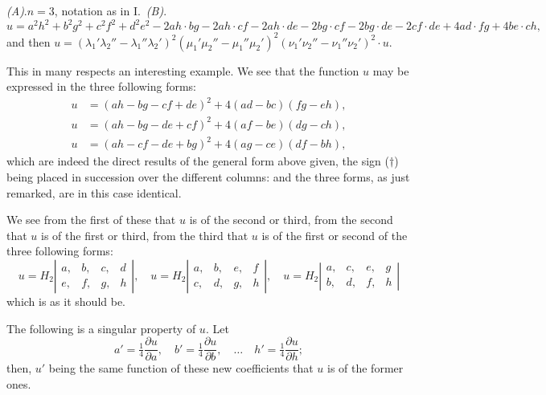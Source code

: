\documentclass[11pt,a4paper]{book}
\begin{document}
\textit{(A)}.\quad $n=3$, notation as in I.\ \textit{(B)}.
\[
u = a^2h^2 + b^2g^2 + c^2f^2 + d^2e^2 - 2ah \cdot bg - 2ah \cdot cf - 2ah \cdot de - 2bg \cdot cf - 2bg \cdot de - 2cf \cdot de + 4ad \cdot fg + 4be \cdot ch,
\]
and then $u = (\lambda_1'\lambda_2'' - \lambda_1''\lambda_2')^2 (\mu_1'\mu_2'' - \mu_1''\mu_2')^2 (\nu_1'\nu_2'' - \nu_1''\nu_2')^2 \cdot u$.

This in many respects an interesting example. We see that the function $u$
may be expressed in the three following forms:
\begin{align*}
u &= (ah - bg - cf + de)^2 + 4(ad - bc)(fg - eh) \tag{1}, \\
u &= (ah - bg - de + cf)^2 + 4(af - be)(dg - ch) \tag{2}, \\
u &= (ah - cf - de + bg)^2 + 4(ag - ce)(df - bh) \tag{3},
\end{align*}
which are indeed the direct results of the general form above given, the sign ($\dagger$)
being placed in succession over the different columns: and the three forms, as just
remarked, are in this case identical.

We see from the first of these that $u$ is of the second or third, from the second
that $u$ is of the first or third, from the third that $u$ is of the first or second of the
three following forms:
\[
u = H_2
\left|\begin{array}{cccc}
a, & b, & c, & d \\
e, & f, & g, & h
\end{array}\right|,
\quad
u = H_2
\left|\begin{array}{cccc}
a, & b, & e, & f \\
c, & d, & g, & h
\end{array}\right|,
\quad
u = H_2
\left|\begin{array}{cccc}
a, & c, & e, & g \\
b, & d, & f, & h
\end{array}\right|
\]
which is as it should be.

The following is a singular property of $u$. Let
\[
a' = \tfrac{1}{4}\frac{\partial u}{\partial a}, \quad b' = \tfrac{1}{4}\frac{\partial u}{\partial b}, \quad \ldots \quad h' = \tfrac{1}{4}\frac{\partial u}{\partial h};
\]
then, $u'$ being the same function of these new coefficients that $u$ is of the former ones.
\end{document}
